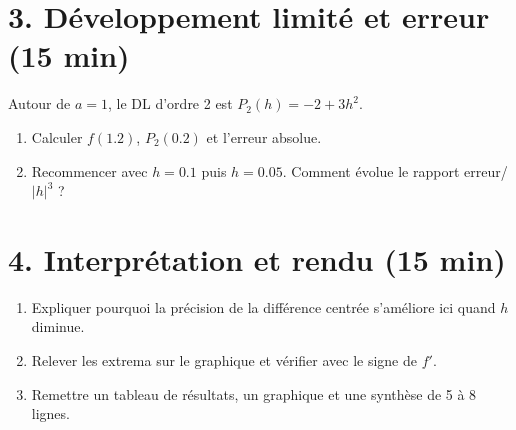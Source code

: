 \documentclass[11pt,a4paper]{article}
\begin{document}
\section*{3. Développement limité et erreur (15 min)}
Autour de $a=1$, le DL d'ordre 2 est $P_2(h)=-2+3h^2$.
\begin{enumerate}[resume]
\item Calculer $f(1.2)$, $P_2(0.2)$ et l'erreur absolue.
\item Recommencer avec $h=0.1$ puis $h=0.05$. Comment évolue le rapport erreur/$|h|^3$ ?
\end{enumerate}

\section*{4. Interprétation et rendu (15 min)}
\begin{enumerate}[resume]
\item Expliquer pourquoi la précision de la différence centrée s'améliore ici quand $h$ diminue.
\item Relever les extrema sur le graphique et vérifier avec le signe de $f'$.
\item Remettre un tableau de résultats, un graphique et une synthèse de 5 à 8 lignes.
\end{enumerate}
\end{document}
